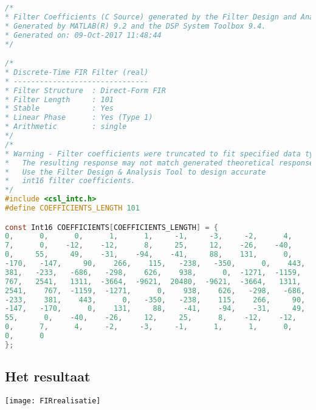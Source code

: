             \begin{lstlisting}[language=c]
/*
* Filter Coefficients (C Source) generated by the Filter Design and Analysis Tool
* Generated by MATLAB(R) 9.2 and the DSP System Toolbox 9.4.
* Generated on: 09-Oct-2017 11:48:44
*/

/*
* Discrete-Time FIR Filter (real)
* -------------------------------
* Filter Structure  : Direct-Form FIR
* Filter Length     : 101
* Stable            : Yes
* Linear Phase      : Yes (Type 1)
* Arithmetic        : single
*/
/*
* Warning - Filter coefficients were truncated to fit specified data type.  
*   The resulting response may not match generated theoretical response.
*   Use the Filter Design & Analysis Tool to design accurate
*   int16 filter coefficients.
*/
#include <csl_intc.h>
#define COEFFICIENTS_LENGTH 101

const Int16 COEFFICIENTS[COEFFICIENTS_LENGTH] = {
0,      0,      0,      1,      1,     -1,     -3,     -2,      4,
7,      0,    -12,    -12,      8,     25,     12,    -26,    -40,
0,     55,     49,    -31,    -94,    -41,     88,    131,      0,
-170,   -147,     90,    266,    115,   -238,   -350,      0,    443,
381,   -233,   -686,   -298,    626,    938,      0,  -1271,  -1159,
767,   2541,   1311,  -3664,  -9621,  20480,  -9621,  -3664,   1311,
2541,    767,  -1159,  -1271,      0,    938,    626,   -298,   -686,
-233,    381,    443,      0,   -350,   -238,    115,    266,     90,
-147,   -170,      0,    131,     88,    -41,    -94,    -31,     49,
55,      0,    -40,    -26,     12,     25,      8,    -12,    -12,
0,      7,      4,     -2,     -3,     -1,      1,      1,      0,
0,      0
};	
            \end{lstlisting}
            \clearpage
        
        
            \subsection{Het resultaat}
            
    \texttt{[image: FIRrealisatie]}\par\vspace{1cm}            
            
            \clearpage
            